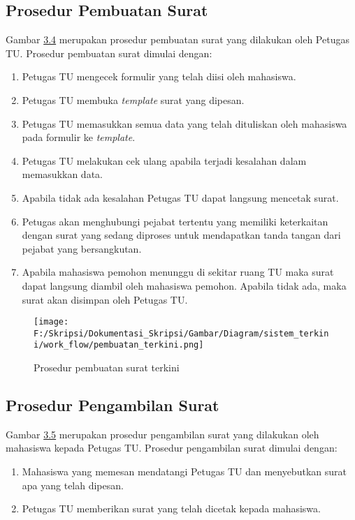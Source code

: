 \subsection{Prosedur Pembuatan Surat}
\label{sec:prosedur_pembuatan_surat}
Gambar \hyperlink{pembuatan_terkini}{3.4} merupakan prosedur pembuatan surat yang dilakukan oleh Petugas TU. Prosedur pembuatan surat dimulai dengan:
\begin{enumerate}
	\item Petugas TU mengecek formulir yang telah diisi oleh mahasiswa.
	\item Petugas TU membuka \textit{template} surat yang dipesan.
	\item Petugas TU memasukkan semua data yang telah dituliskan oleh mahasiswa pada formulir ke \textit{template}.
	\item Petugas TU melakukan cek ulang apabila terjadi kesalahan dalam memasukkan data.
	\item Apabila tidak ada kesalahan Petugas TU dapat langsung mencetak surat.
	\item Petugas akan menghubungi pejabat tertentu yang memiliki keterkaitan dengan surat yang sedang diproses untuk mendapatkan tanda tangan dari pejabat yang bersangkutan.
	\item Apabila mahasiswa pemohon menunggu di sekitar ruang TU maka surat dapat langsung diambil oleh mahasiswa pemohon. Apabila tidak ada, maka surat akan disimpan oleh Petugas TU.
\end{enumerate}

\begin{figure}[H]
	\centering
		\texttt{[image: F:/Skripsi/Dokumentasi\_Skripsi/Gambar/Diagram/sistem\_terkini/work\_flow/pembuatan\_terkini.png]}
	{\caption{Prosedur pembuatan surat terkini}}
	\label{fig:pembuatan_terkini}
\end{figure}

\subsection{Prosedur Pengambilan Surat}
\label{sec:prosedur_pengambilan_surat}
Gambar \hyperlink{pengambilan_terkini}{3.5} merupakan prosedur pengambilan surat yang dilakukan oleh mahasiswa kepada Petugas TU. Prosedur pengambilan surat dimulai dengan:
\begin{enumerate}
	\item Mahasiswa yang memesan mendatangi Petugas TU dan menyebutkan surat apa yang telah dipesan.
	\item Petugas TU memberikan surat yang telah dicetak kepada mahasiswa.
\end{enumerate}

